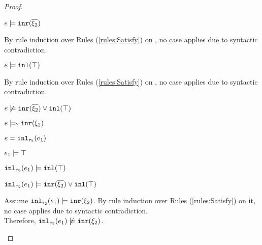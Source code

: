\begin{proof}
\begin{byCases}
\begin{byCases}
\begin{byCases}
            \begin{pfsteps*}
            \item $e \models \mathtt{inr}(\overline{\xi_2})$  
            \end{pfsteps*}
            By rule induction over Rules (\ref{rules:Satisfy}) on , no case applies due to syntactic contradiction.
        \item[\text{(\ref{rule:CSOr2})}]
            \begin{pfsteps*}
            \item $e \models \mathtt{inl}(\top)$  
            \end{pfsteps*}
            By rule induction over Rules (\ref{rules:Satisfy}) on , no case applies due to syntactic contradiction.
        \end{byCases}
        \begin{pfsteps*}
        \item $e \not\models \mathtt{inr}(\overline{\xi_2}) \vee \mathtt{inl}(\top)$  
        \item $e \models_{?} \mathtt{inr}(\xi_2)$ 
        \end{pfsteps*}
    \item[\text{(\ref{rule:TInl})}]
        \begin{pfsteps*}
        \item $e=\mathtt{inl}_{\tau_2}({e_1})$ 
        \item $e_1 \models \top$  
        \item $\mathtt{inl}_{\tau_2}({e_1}) \models \mathtt{inl}(\top)$  
        \item $\mathtt{inl}_{\tau_2}({e_1}) \models \mathtt{inr}(\overline{\xi_2}) \vee \mathtt{inl}(\top)$ 
        \end{pfsteps*}
        Assume $\mathtt{inl}_{\tau_2}({e_1}) \models \mathtt{inr}(\xi_2)$. By rule induction over Rules (\ref{rules:Satisfy}) on it, no case applies due to syntactic contradiction.\\ Therefore, $\mathtt{inl}_{\tau_2}({e_1}) \not\models \mathtt{inr}(\xi_2)$.\\

\end{byCases}
\end{byCases}
\end{proof}
